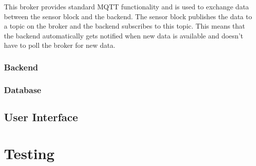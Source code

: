 This broker provides standard MQTT functionality and is used to exchange data between the sensor block and the backend. The sensor block publishes the data to a topic on the broker and the backend subscribes to this topic. This means that the backend automatically gets notified when new data is available and doesn't have to poll the broker for new data.

\subsubsection {Backend} \label{sec:backend}


\subsubsection {Database} \label{sec:database}


\subsection{User Interface}\label{sec:user_interface}


\section{Testing}